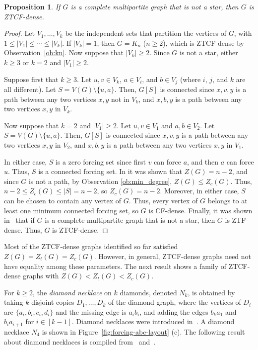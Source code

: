\documentclass[11pt]{article}
\newtheorem{prop}[thm]{Proposition}
\theoremstyle{definition}
\newcommand{\1}{\vspace{0.1cm}}
\newcommand{\2}{\vspace{0.2cm}}
\newcommand{\3}{\vspace{0.3cm}}
\begin{document}
\begin{prop}\label{prop:multipartite}
If $ G $ is a complete multipartite graph that is not a star, then $ G $ is ZTCF-dense. 
\end{prop}

\begin{proof}
Let $ V_1,\ldots, V_k $ be the independent sets that partition the vertices of $G$, with $ 1 \le |V_1| \le \cdots \le |V_k| $. If $ |V_k| = 1 $, then $ G = K_n $ ($n\geq 2$), which is ZTCF-dense by Observation~\ref{ob:kn}. Now suppose that $ |V_k| \ge 2 $. Since $ G $ is not a star,  either $ k \ge 3 $ or $ k = 2 $ and $ |V_1| \ge 2 $. 

Suppose first that $ k \ge 3 $. Let $u,v\in V_k$, $a\in V_i$, and $b\in V_j$ (where $i$, $j$, and $k$ are all different). Let $S=V(G)\setminus \{u,a\}$. Then, $G[S]$ is connected since $x,v,y$ is a path between any two vertices $x,y$ not in $V_k$, and $x,b,y$ is a path between any two vertices $x,y$ in $V_k$. 

Now suppose that $ k = 2 $ and $ |V_1| \ge 2 $. Let $u,v\in V_1$ and $a,b\in V_2$. Let $S=V(G)\setminus \{u,a\}$. Then, $G[S]$ is connected since $x,v,y$ is a path between any two vertices $x,y$ in $V_2$, and $x,b,y$ is a path between any two vertices $x,y$ in $V_1$. 


In either case, $S$ is a zero forcing set since first $v$ can force $a$, and then $a$ can force $u$. Thus, $ S $ is a connected forcing set. In \cite{AIM-Workshop} it was shown that $Z(G) = n - 2$, and since $ G $ is not a path, by Observation \ref{ob:min_degree}, $ Z(G) \le Z_c(G)$. Thus, $ n-2\leq Z_c(G)  \le |S|=n - 2$, so $ Z_c(G) = n - 2 $. Moreover, in either case, $S$ can be chosen to contain any vertex of $G$. Thus, every vertex of $G$ belongs to at least one minimum connected forcing set, so $ G $ is CF-dense. Finally, it was shown in~\cite{DaHePe2023a} that if $ G $ is a complete multipartite graph that is not a star, then $ G $ is ZTF-dense. Thus, $G$ is ZTCF-dense.
\end{proof}



Most of the ZTCF-dense graphs identified so far satisfied $ Z(G) = Z_t(G) = Z_c(G) $. However, in general, ZTCF-dense graphs need not have equality among these parameters. The next result shows a family of ZTCF-dense graphs with $ Z(G) < Z_t(G) < Z_c(G)$. 

For $ k \ge 2 $, the \emph{diamond necklace} on $ k $ diamonds, denoted  $ N_k $, is obtained by taking $ k $ disjoint copies $ D_1, \dots, D_k $ of the diamond graph, where the vertices of $ D_i $ are $ \{a_i, b_i, c_i, d_i\} $ and the missing edge is $ a_ib_i $, and adding the edges $b_k a_1$ and $ b_i a_{i+1} $ for $ i \in [k-1] $. Diamond necklaces were introduced in~\cite{HeLo12}. A diamond necklace $ N_4 $ is shown in Figure~\ref{fig:forcing-abc-layout} (c). The following result about diamond necklaces is compiled from~\cite{DaHe18b} and~\cite{DaHePe2023a}.
\end{document}
